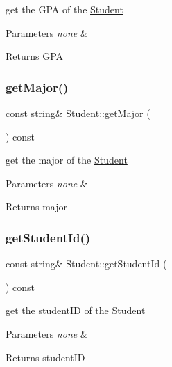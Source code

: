 get the G\+PA of the \hyperlink{classStudent}{Student}


\begin{DoxyParams}{Parameters}
{\em none} & \\
\hline
\end{DoxyParams}
\begin{DoxyReturn}{Returns}
G\+PA 
\end{DoxyReturn}
\mbox{\label{classStudent_a3459baf164df16c8dc2feccd5d5b9359}} 
\subsubsection{\texorpdfstring{get\+Major()}{getMajor()}}
{\footnotesize\ttfamily const string\& Student\+::get\+Major (\begin{DoxyParamCaption}{ }\end{DoxyParamCaption}) const\hspace{0.3cm}{\ttfamily [inline]}}

get the major of the \hyperlink{classStudent}{Student}


\begin{DoxyParams}{Parameters}
{\em none} & \\
\hline
\end{DoxyParams}
\begin{DoxyReturn}{Returns}
major 
\end{DoxyReturn}
\mbox{\label{classStudent_aa7cb331368e30c08743ced08f4496fa5}} 
\subsubsection{\texorpdfstring{get\+Student\+Id()}{getStudentId()}}
{\footnotesize\ttfamily const string\& Student\+::get\+Student\+Id (\begin{DoxyParamCaption}{ }\end{DoxyParamCaption}) const\hspace{0.3cm}{\ttfamily [inline]}}

get the student\+ID of the \hyperlink{classStudent}{Student}


\begin{DoxyParams}{Parameters}
{\em none} & \\
\hline
\end{DoxyParams}
\begin{DoxyReturn}{Returns}
student\+ID 
\end{DoxyReturn}
\mbox{\label{classStudent_a8acce34a6019a9bc3642c3471544b1bc}} 
